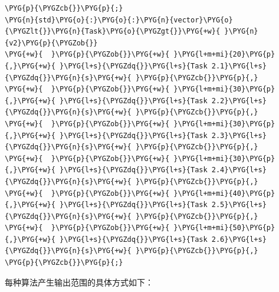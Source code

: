 \begin{codeblockbg}
\begin{Verbatim}[commandchars=\\\{\},breaklines=true,breakanywhere=true,fontsize=\codefont,xleftmargin=17bp]
\PYG{p}{\PYGZcb{}}\PYG{p}{;}
\PYG{n}{std}\PYG{o}{:}\PYG{o}{:}\PYG{n}{vector}\PYG{o}{\PYGZlt{}}\PYG{n}{Task}\PYG{o}{\PYGZgt{}}\PYG{+w}{ }\PYG{n}{v2}\PYG{p}{\PYGZob{}}
\PYG{+w}{  }\PYG{p}{\PYGZob{}}\PYG{+w}{ }\PYG{l+m+mi}{20}\PYG{p}{,}\PYG{+w}{ }\PYG{l+s}{\PYGZdq{}}\PYG{l+s}{Task 2.1}\PYG{l+s}{\PYGZdq{}}\PYG{n}{s}\PYG{+w}{ }\PYG{p}{\PYGZcb{}}\PYG{p}{,}
\PYG{+w}{  }\PYG{p}{\PYGZob{}}\PYG{+w}{ }\PYG{l+m+mi}{30}\PYG{p}{,}\PYG{+w}{ }\PYG{l+s}{\PYGZdq{}}\PYG{l+s}{Task 2.2}\PYG{l+s}{\PYGZdq{}}\PYG{n}{s}\PYG{+w}{ }\PYG{p}{\PYGZcb{}}\PYG{p}{,}
\PYG{+w}{  }\PYG{p}{\PYGZob{}}\PYG{+w}{ }\PYG{l+m+mi}{30}\PYG{p}{,}\PYG{+w}{ }\PYG{l+s}{\PYGZdq{}}\PYG{l+s}{Task 2.3}\PYG{l+s}{\PYGZdq{}}\PYG{n}{s}\PYG{+w}{ }\PYG{p}{\PYGZcb{}}\PYG{p}{,}
\PYG{+w}{  }\PYG{p}{\PYGZob{}}\PYG{+w}{ }\PYG{l+m+mi}{30}\PYG{p}{,}\PYG{+w}{ }\PYG{l+s}{\PYGZdq{}}\PYG{l+s}{Task 2.4}\PYG{l+s}{\PYGZdq{}}\PYG{n}{s}\PYG{+w}{ }\PYG{p}{\PYGZcb{}}\PYG{p}{,}
\PYG{+w}{  }\PYG{p}{\PYGZob{}}\PYG{+w}{ }\PYG{l+m+mi}{40}\PYG{p}{,}\PYG{+w}{ }\PYG{l+s}{\PYGZdq{}}\PYG{l+s}{Task 2.5}\PYG{l+s}{\PYGZdq{}}\PYG{n}{s}\PYG{+w}{ }\PYG{p}{\PYGZcb{}}\PYG{p}{,}
\PYG{+w}{  }\PYG{p}{\PYGZob{}}\PYG{+w}{ }\PYG{l+m+mi}{50}\PYG{p}{,}\PYG{+w}{ }\PYG{l+s}{\PYGZdq{}}\PYG{l+s}{Task 2.6}\PYG{l+s}{\PYGZdq{}}\PYG{n}{s}\PYG{+w}{ }\PYG{p}{\PYGZcb{}}\PYG{p}{,}
\PYG{p}{\PYGZcb{}}\PYG{p}{;}
\end{Verbatim}
\end{codeblockbg}



每种算法产生输出范围的具体方式如下：



